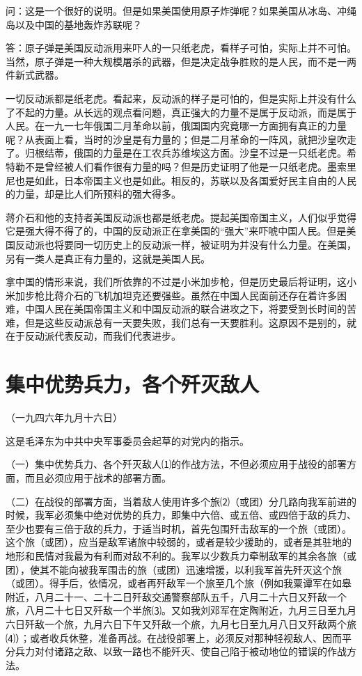\documentclass[UTF-8, a5paper, 12pt]{ctexart}
\begin{document}
问：这是一个很好的说明。但是如果美国使用原子炸弹呢？如果美国从冰岛、冲绳岛以及中国的基地轰炸苏联呢？

答：原子弹是美国反动派用来吓人的一只纸老虎，看样子可怕，实际上并不可怕。当然，原子弹是一种大规模屠杀的武器，但是决定战争胜败的是人民，而不是一两件新式武器。

一切反动派都是纸老虎。看起来，反动派的样子是可怕的，但是实际上并没有什么了不起的力量。从长远的观点看问题，真正强大的力量不是属于反动派，而是属于人民。在一九一七年俄国二月革命以前，俄国国内究竟哪一方面拥有真正的力量呢？从表面上看，当时的沙皇是有力量的；但是二月革命的一阵风，就把沙皇吹走了。归根结蒂，俄国的力量是在工农兵苏维埃这方面。沙皇不过是一只纸老虎。希特勒不是曾经被人们看作很有力量的吗？但是历史证明了他是一只纸老虎。墨索里尼也是如此，日本帝国主义也是如此。相反的，苏联以及各国爱好民主自由的人民的力量，却是比人们所预料的强大得多。

蒋介石和他的支持者美国反动派也都是纸老虎。提起美国帝国主义，人们似乎觉得它是强大得不得了的，中国的反动派正在拿美国的“强大”来吓唬中国人民。但是美国反动派也将要同一切历史上的反动派一样，被证明为并没有什么力量。在美国，另有一类人是真正有力量的，这就是美国人民。

拿中国的情形来说，我们所依靠的不过是小米加步枪，但是历史最后将证明，这小米加步枪比蒋介石的飞机加坦克还要强些。虽然在中国人民面前还存在着许多困难，中国人民在美国帝国主义和中国反动派的联合进攻之下，将要受到长时间的苦难，但是这些反动派总有一天要失败，我们总有一天要胜利。这原因不是别的，就在于反动派代表反动，而我们代表进步。

\section{集中优势兵力，各个歼灭敌人}

（一九四六年九月十六日）

这是毛泽东为中共中央军事委员会起草的对党内的指示。

（一）集中优势兵力、各个歼灭敌人⑴的作战方法，不但必须应用于战役的部署方面，而且必须应用于战术的部署方面。

（二）在战役的部署方面，当着敌人使用许多个旅⑵（或团）分几路向我军前进的时候，我军必须集中绝对优势的兵力，即集中六倍、或五倍、或四倍于敌的兵力、至少也要有三倍于敌的兵力，于适当时机，首先包围歼击敌军的一个旅（或团）。这个旅（或团），应当是敌军诸旅中较弱的，或者是较少援助的，或者是其驻地的地形和民情对我最为有利而对敌不利的。我军以少数兵力牵制敌军的其余各旅（或团），使其不能向被我军围击的旅（或团）迅速增援，以利我军首先歼灭这个旅（或团）。得手后，依情况，或者再歼敌军一个旅至几个旅（例如我粟谭军在如皋附近，八月二十一、二十二日歼敌交通警察部队五千，八月二十六日又歼敌一个旅，八月二十七日又歼敌一个半旅⑶。又如我刘邓军在定陶附近，九月三日至九月六日歼敌一个旅，九月六日下午又歼敌一个旅，九月七日至九月八日又歼敌两个旅⑷）；或者收兵休整，准备再战。在战役部署上，必须反对那种轻视敌人、因而平分兵力对付诸路之敌、以致一路也不能歼灭、使自己陷于被动地位的错误的作战方法。
\end{document}
